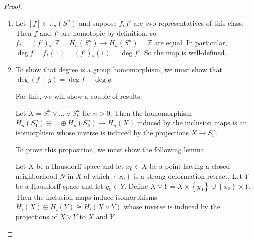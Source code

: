         \begin{proof}


        \begin{enumerate}
            \item Let
                $ \left[ f \right] 
                \in \pi_n \left( S^{n} \right) $ and
                suppose $f, f'$ are two representatives of
                this class. Then
                $f$ and $f'$ are homotopic by definition,
                so $f_* = \left( f' \right)_* \colon
                \mathbb{Z} = H_n\left( S^{n} \right) \to 
                H_n\left( S^{n} \right) = \mathbb{Z} $ are equal.
                In particular,
                $\deg f = f_*(1) = \left( f' \right)_* (1)
                = \deg f'$. So the map is well-defined.
            \item To show that degree is a group homomorphism,
                we must show that
                $\deg \left( f+g \right) = 
                \deg f + \deg g$.

                For this, we will show a couple of results.

                \begin{proposition}[]
                    Let $X = S_1^{n} \vee \ldots \vee
                    S_k^{n}$ for $n > 0$. Then
                    the homomorphism 
                    $H_n\left( S_1^{n} \right) \oplus \ldots
                    \oplus H_n\left( S_k^{n} \right) 
                    \to H_n(X)$ induced by the inclusion maps
                    is an isomorphism whose inverse
                    is induced by the projections
                    $X \to S_i^{n}$.
                \end{proposition}
                
                To prove this proposition, we must show the following
                lemma.

                \begin{lemma}[]
                    Let $X$ be a Hausdorff space and let
                    $x_0 \in X$ be a point having a closed
                    neighborhood $N$ in $X$ of which
                    $\left\{ x_0 \right\} $ is a strong deformation
                    retract. Let $Y$ be a Hausdorff space and
                    let $y_0 \in Y$. Define
                    $X \vee Y = X \times \left\{ y_0 \right\} 
                    \cup \left\{ x_0 \right\} \times Y$.
                    Then the inclusion maps induce
                    isomorphisms 
                    $\tilde{H}_i(X) \oplus \tilde{H}_i(Y)
                    \cong \tilde{H}_i\left( X \vee Y \right) $
                    whose inverse is induced by the projections
                    of $X \vee Y$ to $X$ and $Y$.
                \end{lemma}
                

\end{enumerate}
\end{proof}
